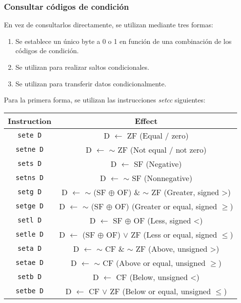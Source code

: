 \subsubsection{Consultar códigos de condición}
En vez de consultarlos directamente, se utilizan mediante tres formas:
\begin{enumerate}
	\item Se establece un único byte a 0 o 1 en función de una combinación de los códigos de condición.
	\item Se utilizan para realizar saltos condicionales.
	\item Se utilizan para transferir datos condicionalmente.
\end{enumerate}
Para la primera forma, se utilizan las instrucciones \textit{setcc} siguientes:
\begin{center}
	\begin{tabular}{|c|c|}
		\hline
		\textbf{Instruction} & \textbf{Effect}                                                          \\ \hline
		\texttt{sete D}      & D $\leftarrow$ ZF (Equal / zero)                                         \\ \hline
		\texttt{setne D}     & D $\leftarrow$ $\sim$ ZF (Not equal / not zero)                          \\ \hline
		\texttt{sets D}      & D $\leftarrow$ SF (Negative)                                             \\ \hline
		\texttt{setns D}     & D $\leftarrow$ $\sim$ SF (Nonnegative)                                   \\ \hline
		\texttt{setg D}      & D $\leftarrow$ $\sim$ (SF $\oplus$ OF) \& $\sim$ ZF (Greater, signed >)  \\ \hline
		\texttt{setge D}     & D $\leftarrow$ $\sim$ (SF $\oplus$ OF) (Greater or equal, signed $\geq$) \\ \hline
		\texttt{setl D}      & D $\leftarrow$ SF $\oplus$ OF (Less, signed <)                           \\ \hline
		\texttt{setle D}     & D $\leftarrow$ (SF $\oplus$ OF) $\lor$ ZF (Less or equal, signed $\leq$) \\ \hline
		\texttt{seta D}      & D $\leftarrow$ $\sim$ CF \& $\sim$ ZF (Above, unsigned >)                \\ \hline
		\texttt{setae D}     & D $\leftarrow$ $\sim$ CF (Above or equal, unsigned $\geq$)               \\ \hline
		\texttt{setb D}      & D $\leftarrow$ CF (Below, unsigned <)                                    \\ \hline
		\texttt{setbe D}     & D $\leftarrow$ CF $\lor$ ZF (Below or equal, unsigned $\leq$)            \\ \hline
	\end{tabular}
\end{center}
